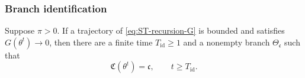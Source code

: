 \subsubsection{Branch identification}
\label{subsec:branch-identification}

\begin{lemma}
\label{lem:st-finite-identification}
Suppose $\pi>0$.
If a trajectory of \eqref{eq:ST-recursion-G} is bounded and satisfies
$G(\theta^t)\to0$, then there are a finite time
$T_{\mathrm{id}}\geq1$ and a nonempty branch
$\Theta_{\mathfrak c}$ such that
\begin{equation}
    \mathfrak C(\theta^t)=\mathfrak c,
    \qquad t\geq T_{\mathrm{id}}.
    \label{eq:st-finite-branch-identification}
\end{equation}
\end{lemma}

